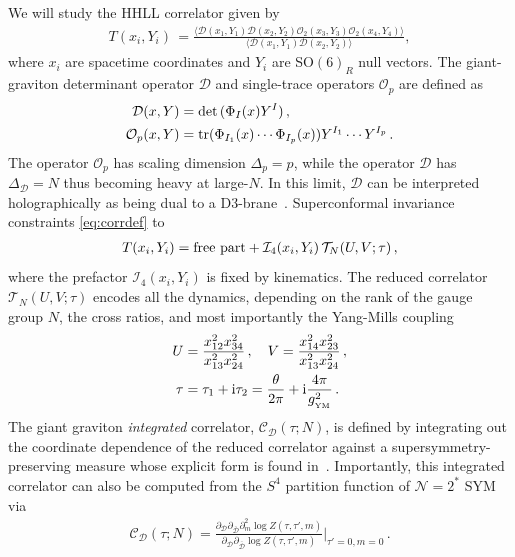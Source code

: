 \documentclass[aps,prl,twocolumn, longbibliography,footinbib,superscriptaddress, preprintnumbers]{revtex4-1}
\newcommand{\<}{\langle}
\renewcommand{\>}{\rangle}
\def\tr{{\rm tr}}
\def\det{{\rm det \,}}
\begin{document}
We will study the HHLL correlator given by
\begin{align} \label{eq:corrdef}
\! T(x_i,\! Y_i)\,{=}\frac{  \langle  \mathcal{D}(x_1, \!Y_1) \mathcal{D}(x_2, \!Y_2) \mathcal{O}_2(x_3,\!Y_3) \mathcal{O}_2(x_4, \!Y_4) \rangle }{ \langle  \mathcal{D}(x_1, \!Y_1) \mathcal{D}(x_2, \!Y_2) \rangle} ,
\end{align}
where $x_i$ are spacetime coordinates and $Y_i$ are SO$(6)_R$ null vectors. The giant-graviton determinant operator $\mathcal{D}$ and single-trace operators $\mathcal{O}_p$ are defined as
\begin{align} \label{eq:operators}
    \mathcal{D}(x, Y) &= \det  (\Phi_I(x) Y^I) \, ,  \\
    \mathcal{O}_p(x, Y) &=\tr (\Phi_{I_1}(x) \cdots \Phi_{I_p}(x) ) Y^{I_1} \cdots Y^{I_p} \, .
\end{align}
The operator $\mathcal{O}_p$ has scaling dimension $\Delta_p=p$, while the operator $\mathcal{D}$ has $\Delta_{\mathcal{D}} = N$ thus becoming heavy at large-$N$. In this limit, $\mathcal{D}$ can be interpreted holographically as being dual to a D3-brane~\cite{McGreevy:2000cw,Hashimoto:2000zp, Balasubramanian:2001nh, Corley:2001zk}. Superconformal invariance~\cite{Eden:2000bk, Nirschl:2004pa} constraints \eqref{eq:corrdef} to
\begin{align}\label{eq:redCorr}
    T(x_i, Y_i) = {\rm free\,\, part} + \mathcal{I}_4(x_i, Y_i)\, \mathcal{T}_N(U, V; \tau) \, ,
\end{align}
where the prefactor $\mathcal{I}_4(x_i, Y_i)$ is fixed by kinematics. The reduced correlator $\mathcal{T}_N(U, V; \tau)$ encodes all the dynamics, depending on the rank of the gauge group $N$, the cross ratios, and  most importantly the Yang-Mills coupling
\begin{align}
    U &\label{eq:Cross}= \frac{x_{12}^2 x_{34}^2}{x_{13}^2 x_{24}^2} \, , \quad   V= \frac{x_{14}^2 x_{23}^2}{x_{13}^2 x_{24}^2} \,, \\
     \tau &= \tau_1 + {\rm i} \tau_2  = \frac{\theta}{2\pi} + {\rm i} \frac{4\pi}{g^2_{_{\rm YM}}}\, .
\end{align}
The giant graviton \textit{integrated} correlator, $\mathcal{C}_{\mathcal{D}} (\tau; N)$, is defined by integrating out the coordinate dependence of the reduced correlator against a supersymmetry-preserving measure whose explicit form is found in~\cite{Binder:2019jwn, Chester:2020dja}.
Importantly, this  integrated correlator can also be computed from the $S^4$ partition function of $\mathcal{N}=2^*$ SYM via
\begin{align} \label{eq:CD-or}
\mathcal{C}_{\mathcal{D}} (\tau; N) = \frac{\partial_{\mathcal{D} } \partial_{\bar{ \mathcal{D} } }  \partial_m^2 \log Z  (\tau, \tau', m) } {\partial_{\mathcal{D} } \partial_{\bar {\mathcal{D} } }  \log Z  (\tau, \tau', m)  } \Big \vert_{\tau'=0, m=0}\, .
\end{align}
\end{document}
